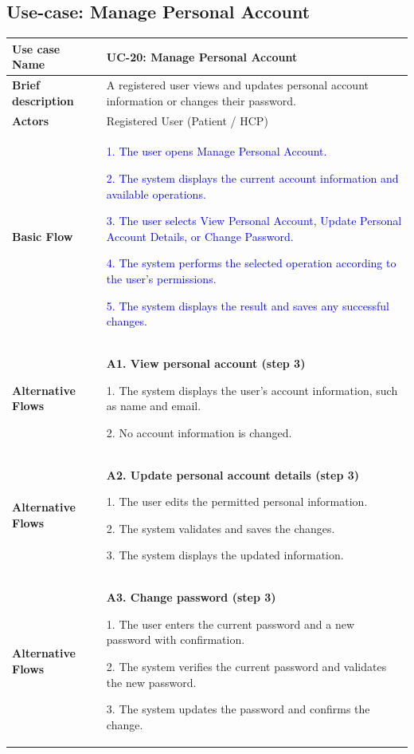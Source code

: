 \subsection{Use-case: Manage Personal Account}
\label{uc:uc-20}
\begin{longtable}{|p{}|p{}|}
\hline
\textbf{Use case Name} &
UC-20: Manage Personal Account
\\ \hline
\textbf{Brief description} &
A registered user views and updates personal account information or changes their password.
\\ \hline
\textbf{Actors} &
Registered User (Patient / HCP)
\\ \hline
\textbf{Basic Flow} &
\textcolor{blue}{1. The user opens Manage Personal Account.}\par
\textcolor{blue}{2. The system displays the current account information and available operations.}\par
\textcolor{blue}{3. The user selects View Personal Account, Update Personal Account Details, or Change Password.}\par
\textcolor{blue}{4. The system performs the selected operation according to the user's permissions.}\par
\textcolor{blue}{5. The system displays the result and saves any successful changes.}
\\ \hline
\textbf{Alternative Flows} &
\textbf{A1. View personal account (step 3)}\par
1. The system displays the user's account information, such as name and email.\par
2. No account information is changed.
\\ \hline
\textbf{Alternative Flows} &
\textbf{A2. Update personal account details (step 3)}\par
1. The user edits the permitted personal information.\par
2. The system validates and saves the changes.\par
3. The system displays the updated information.
\\ \hline
\textbf{Alternative Flows} &
\textbf{A3. Change password (step 3)}\par
1. The user enters the current password and a new password with confirmation.\par
2. The system verifies the current password and validates the new password.\par
3. The system updates the password and confirms the change.
\par

\end{longtable}
